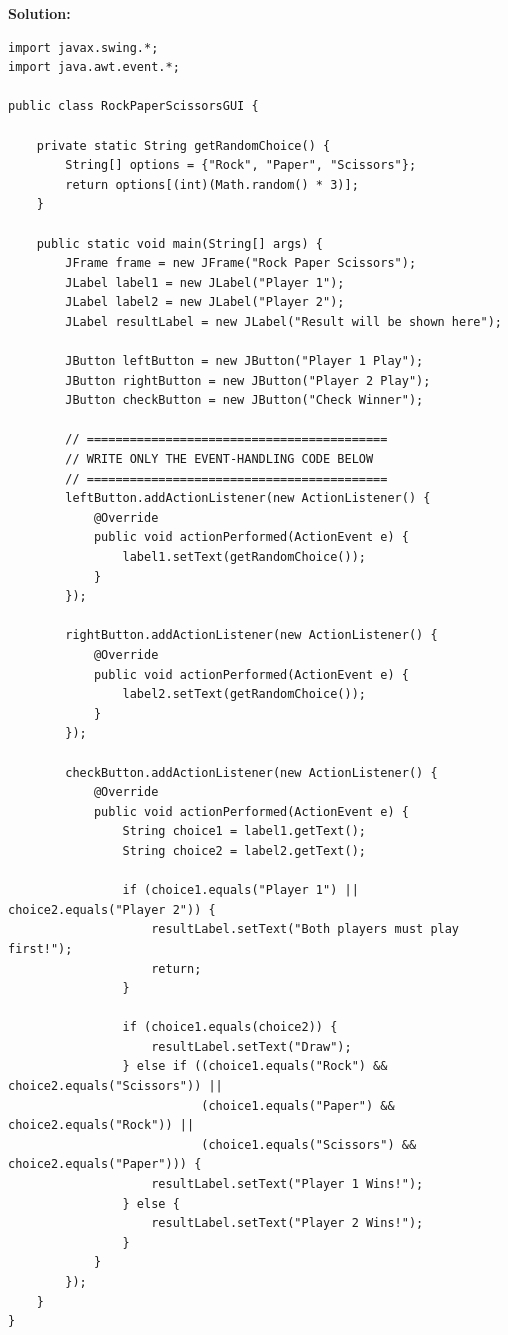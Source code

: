 \documentclass[11pt,a4paper]{article}
\begin{document}
\noindent\textbf{Solution:}
\begin{lstlisting}
import javax.swing.*;
import java.awt.event.*;

public class RockPaperScissorsGUI {

    private static String getRandomChoice() {
        String[] options = {"Rock", "Paper", "Scissors"};
        return options[(int)(Math.random() * 3)];
    }

    public static void main(String[] args) {
        JFrame frame = new JFrame("Rock Paper Scissors");
        JLabel label1 = new JLabel("Player 1");
        JLabel label2 = new JLabel("Player 2");
        JLabel resultLabel = new JLabel("Result will be shown here");
        
        JButton leftButton = new JButton("Player 1 Play");
        JButton rightButton = new JButton("Player 2 Play");
        JButton checkButton = new JButton("Check Winner");

        // ==========================================
        // WRITE ONLY THE EVENT-HANDLING CODE BELOW
        // ==========================================
        leftButton.addActionListener(new ActionListener() {
            @Override
            public void actionPerformed(ActionEvent e) {
                label1.setText(getRandomChoice());
            }
        });

        rightButton.addActionListener(new ActionListener() {
            @Override
            public void actionPerformed(ActionEvent e) {
                label2.setText(getRandomChoice());
            }
        });

        checkButton.addActionListener(new ActionListener() {
            @Override
            public void actionPerformed(ActionEvent e) {
                String choice1 = label1.getText();
                String choice2 = label2.getText();

                if (choice1.equals("Player 1") || choice2.equals("Player 2")) {
                    resultLabel.setText("Both players must play first!");
                    return;
                }

                if (choice1.equals(choice2)) {
                    resultLabel.setText("Draw");
                } else if ((choice1.equals("Rock") && choice2.equals("Scissors")) ||
                           (choice1.equals("Paper") && choice2.equals("Rock")) ||
                           (choice1.equals("Scissors") && choice2.equals("Paper"))) {
                    resultLabel.setText("Player 1 Wins!");
                } else {
                    resultLabel.setText("Player 2 Wins!");
                }
            }
        });
    }
}
\end{lstlisting}
\end{document}
